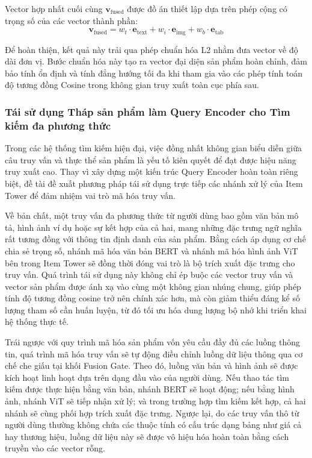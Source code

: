 Vector hợp nhất cuối cùng $\mathbf{v}_{\text{fused}}$ được đồ án thiết lập dựa trên phép cộng có trọng số của các vector thành phần:
\begin{equation}
    \mathbf{v}_{\text{fused}} = w_t \cdot \mathbf{e}_{\text{text}} + w_i \cdot \mathbf{e}_{\text{img}} + w_b \cdot \mathbf{e}_{\text{tab}}
\end{equation}

Để hoàn thiện, kết quả này trải qua phép chuẩn hóa L2 nhằm đưa vector về độ dài đơn vị. Bước chuẩn hóa này tạo ra vector đại diện sản phẩm hoàn chỉnh, đảm bảo tính ổn định và tính đẳng hướng tối đa khi tham gia vào các phép tính toán độ tương đồng Cosine trong không gian truy xuất toàn cục phía sau.

\subsubsection{Tái sử dụng Tháp sản phẩm làm Query Encoder cho Tìm kiếm đa phương thức}

Trong các hệ thống tìm kiếm hiện đại, việc đồng nhất không gian biểu diễn giữa câu truy vấn và thực thể sản phẩm là yếu tố kiên quyết để đạt được hiệu năng truy xuất cao. Thay vì xây dựng một kiến trúc Query Encoder hoàn toàn riêng biệt, đề tài đề xuất phương pháp tái sử dụng trực tiếp các nhánh xử lý của Item Tower để đảm nhiệm vai trò mã hóa truy vấn. 

Về bản chất, một truy vấn đa phương thức từ người dùng bao gồm văn bản mô tả, hình ảnh ví dụ hoặc sự kết hợp của cả hai, mang những đặc trưng ngữ nghĩa rất tương đồng với thông tin định danh của sản phẩm. Bằng cách áp dụng cơ chế chia sẻ trọng số, nhánh mã hóa văn bản BERT và nhánh mã hóa hình ảnh ViT bên trong Item Tower sẽ đồng thời đóng vai trò là bộ trích xuất đặc trưng cho truy vấn. Quá trình tái sử dụng này không chỉ ép buộc các vector truy vấn và vector sản phẩm được ánh xạ vào cùng một không gian nhúng chung, giúp phép tính độ tương đồng cosine trở nên chính xác hơn, mà còn giảm thiểu đáng kể số lượng tham số cần huấn luyện, từ đó tối ưu hóa dung lượng bộ nhớ khi triển khai hệ thống thực tế.

Trái ngược với quy trình mã hóa sản phẩm vốn yêu cầu đầy đủ các luồng thông tin, quá trình mã hóa truy vấn sẽ tự động điều chỉnh luồng dữ liệu thông qua cơ chế che giấu tại khối Fusion Gate. Theo đó, luồng văn bản và hình ảnh sẽ được kích hoạt linh hoạt dựa trên dạng đầu vào của người dùng. Nếu thao tác tìm kiếm được thực hiện bằng văn bản, nhánh BERT sẽ hoạt động; nếu bằng hình ảnh, nhánh ViT sẽ tiếp nhận xử lý; và trong trường hợp tìm kiếm kết hợp, cả hai nhánh sẽ cùng phối hợp trích xuất đặc trưng. Ngược lại, do các truy vấn thô từ người dùng thường không chứa các thuộc tính có cấu trúc dạng bảng như giá cả hay thương hiệu, luồng dữ liệu này sẽ được vô hiệu hóa hoàn toàn bằng cách truyền vào các vector rỗng. 

